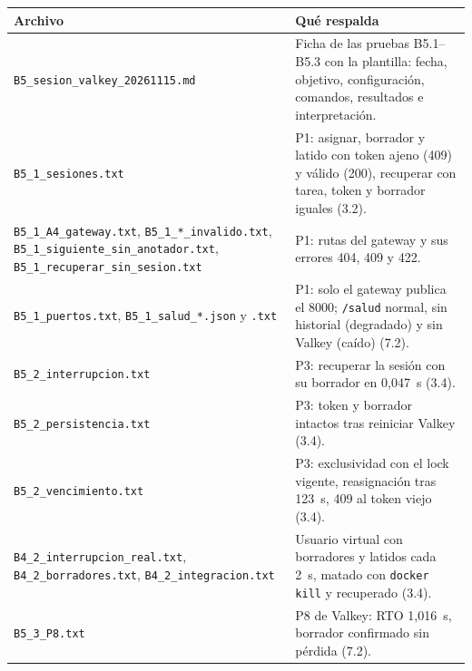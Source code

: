 \documentclass[10pt,letterpaper]{article}
\begin{document}
{\small
\begin{longtable}{@{}p{}p{}@{}}
\toprule
Archivo & Qué respalda \\
\midrule
\endhead
\texttt{B5\_sesion\_valkey\_20261115.md} & Ficha de las pruebas B5.1--B5.3 con la plantilla: fecha, objetivo, configuración, comandos, resultados e interpretación. \\
\texttt{B5\_1\_sesiones.txt} & P1: asignar, borrador y latido con token ajeno (409) y válido (200), recuperar con tarea, token y borrador iguales (3.2). \\
\texttt{B5\_1\_A4\_gateway.txt}, \texttt{B5\_1\_*\_invalido.txt}, \texttt{B5\_1\_siguiente\_sin\_anotador.txt}, \texttt{B5\_1\_recuperar\_sin\_sesion.txt} & P1: rutas del gateway y sus errores 404, 409 y 422. \\
\texttt{B5\_1\_puertos.txt}, \texttt{B5\_1\_salud\_*.json} y \texttt{.txt} & P1: solo el gateway publica el 8000; \texttt{/salud} normal, sin historial (degradado) y sin Valkey (caído) (7.2). \\
\texttt{B5\_2\_interrupcion.txt} & P3: recuperar la sesión con su borrador en 0,047~s (3.4). \\
\texttt{B5\_2\_persistencia.txt} & P3: token y borrador intactos tras reiniciar Valkey (3.4). \\
\texttt{B5\_2\_vencimiento.txt} & P3: exclusividad con el lock vigente, reasignación tras 123~s, 409 al token viejo (3.4). \\
\texttt{B4\_2\_interrupcion\_real.txt}, \texttt{B4\_2\_borradores.txt}, \texttt{B4\_2\_integracion.txt} & Usuario virtual con borradores y latidos cada 2~s, matado con \texttt{docker kill} y recuperado (3.4). \\
\texttt{B5\_3\_P8.txt} & P8 de Valkey: RTO 1,016~s, borrador confirmado sin pérdida (7.2). \\
\bottomrule
\end{longtable}
}
\end{document}

